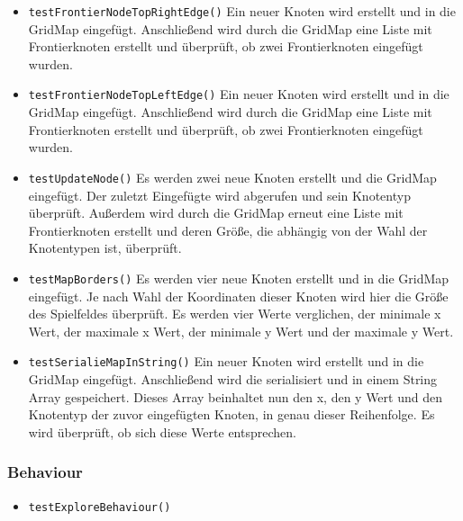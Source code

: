 \documentclass[10pt,a4paper]{article}
\begin{document}
\begin{itemize}
				\item \texttt{testFrontierNodeTopRightEdge()} Ein neuer Knoten wird erstellt und in die GridMap eingefügt. Anschließend wird durch die GridMap eine Liste mit 									Frontierknoten erstellt und überprüft, ob zwei Frontierknoten eingefügt wurden.
				\item \texttt{testFrontierNodeTopLeftEdge()} Ein neuer Knoten wird erstellt und in die GridMap eingefügt. Anschließend wird durch die GridMap eine Liste mit 									Frontierknoten erstellt und überprüft, ob zwei Frontierknoten eingefügt wurden.
				\item \texttt{testUpdateNode()} Es werden zwei neue Knoten erstellt und die GridMap eingefügt. Der zuletzt Eingefügte wird abgerufen und sein Knotentyp überprüft. Außerdem 					wird durch die GridMap erneut eine Liste mit Frontierknoten erstellt und deren Größe, die abhängig von der Wahl der Knotentypen ist, überprüft.
				\item \texttt{testMapBorders()} Es werden vier neue Knoten erstellt und in die GridMap eingefügt. Je nach Wahl der Koordinaten dieser Knoten wird hier die Größe des 							Spielfeldes überprüft. Es werden vier Werte verglichen, der minimale x Wert, der maximale x Wert, der minimale y Wert und der maximale y Wert.
				\item \texttt{testSerialieMapInString()} Ein neuer Knoten wird erstellt und in die GridMap eingefügt. Anschließend wird die serialisiert und in einem String Array 								gespeichert. Dieses Array beinhaltet nun den x, den y Wert und den Knotentyp der zuvor eingefügten Knoten, in genau dieser Reihenfolge. Es wird überprüft, ob sich diese Werte 				entsprechen.
			\end{itemize}
			
			\subsubsection{Behaviour}
			\begin{itemize}
				\item \texttt{testExploreBehaviour()} 
			\end{itemize}
			
\end{document}
